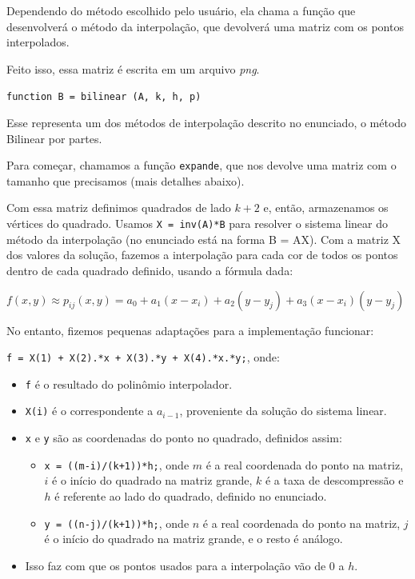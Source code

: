 \documentclass[12pt,letterpaper]{article}
\begin{document}
	Dependendo do método escolhido pelo usuário, ela chama a função que desenvolverá o método da interpolação, que devolverá uma matriz com os pontos interpolados.
	
	Feito isso, essa matriz é escrita em um arquivo \textit{png}.

	\begin{center}
		\texttt{function B = bilinear (A, k, h, p)}
	\end{center}
	
	Esse representa um dos métodos de interpolação descrito no enunciado, o método Bilinear por partes.
	
	Para começar, chamamos a função \texttt{expande}, que nos devolve uma matriz com o tamanho que precisamos (mais detalhes abaixo).
	
	Com essa matriz definimos quadrados de lado $k+2$ e, então, armazenamos os vértices do quadrado. Usamos \texttt{X = inv(A)*B} para resolver o sistema linear do método da interpolação (no enunciado está na forma B = AX). Com a matriz X dos valores da solução, fazemos a interpolação para cada cor de todos os pontos dentro de cada quadrado definido, usando a fórmula dada:
	
	\begin{center}
		$f(x, y) \approx p_{ij} (x, y) = a_0 + a_1(x - x_i ) + a_2 (y - y_j ) + a_3 (x - x_i )(y - y_j)$
	\end{center}
	
	No entanto, fizemos pequenas adaptações para a implementação funcionar:
	
	\begin{center}
		\texttt{f = X(1) + X(2).*x + X(3).*y + X(4).*x.*y;}, onde:
	\end{center}
	
	\begin{itemize}
		\item \texttt{f} é o resultado do polinômio interpolador.
		\item \texttt{X(i)} é o correspondente a $a_{i-1}$, proveniente da solução do sistema linear.
		\item \texttt{x} e \texttt{y} são as coordenadas do ponto no quadrado, definidos assim:
		\begin{itemize}
			\item \texttt{x = ((m-i)/(k+1))*h;}, onde $m$ é a real coordenada do ponto na matriz, $i$ é o início do quadrado na matriz grande, $k$ é a taxa de descompressão e $h$ é referente ao lado do quadrado, definido no enunciado.
			\item \texttt{y = ((n-j)/(k+1))*h;}, onde $n$ é a real coordenada do ponto na matriz, $j$ é o início do quadrado na matriz grande, e o resto é análogo.
		\end{itemize}
		\item Isso faz com que os pontos usados para a interpolação vão de 0 a $h$.
	\end{itemize}
	
\end{document}
